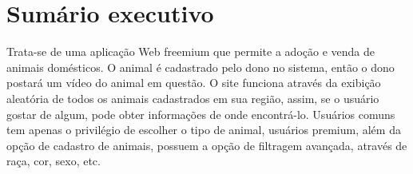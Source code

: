  
\chapter{Sumário executivo}

	Trata-se de uma aplicação Web freemium que permite a adoção e venda de animais domésticos. O animal é cadastrado pelo dono no sistema, então o dono postará um vídeo do animal em questão. O site funciona através da exibição aleatória de todos os animais cadastrados em sua região, assim, se o usuário gostar de algum, pode obter informações de onde encontrá-lo. Usuários comuns tem apenas o privilégio de escolher o tipo de animal, usuários premium, além da opção de cadastro de animais, possuem a opção de filtragem avançada, através de raça, cor, sexo, etc.

	